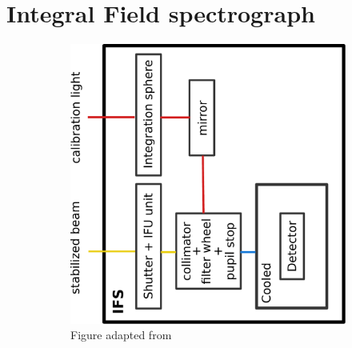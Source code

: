 \documentclass[twoside,single]{lion-msc}
\begin{document}
\section{Integral Field spectrograph}
\begin{figure}[hb]
\centering
\begin{subfigure}{.65\textwidth}
\centering 
\includegraphics[trim={12cm 5cm 12cm 7cm},clip,width = 1\linewidth]{overviewIFS}
\caption{Figure adapted from \cite{Observatory2007}} 
\end{subfigure}\hfill
\begin{subfigure}{.30\textwidth}
  \centering

\end{subfigure}
\end{figure}
\end{document}
